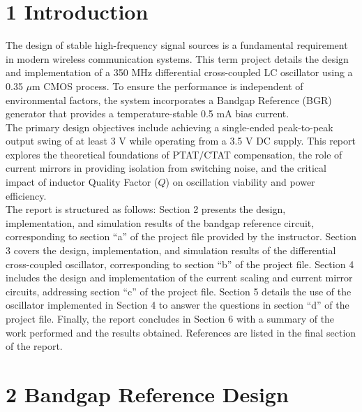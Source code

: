 \documentclass[12pt]{article}
\begin{document}
\section*{1 Introduction}
The design of stable high-frequency signal sources is a fundamental requirement in modern wireless communication systems. This term project details the design and implementation of a 350 MHz differential cross-coupled LC oscillator using a 0.35 $\mu$m CMOS process. To ensure the performance is independent of environmental factors, the system incorporates a Bandgap Reference (BGR) generator that provides a temperature-stable 0.5 mA bias current.\\
\newline
\noindent
The primary design objectives include achieving a single-ended peak-to-peak output swing of at least 3 V while operating from a 3.5 V DC supply. This report explores the theoretical foundations of PTAT/CTAT compensation, the role of current mirrors in providing isolation from switching noise, and the critical impact of inductor Quality Factor ($Q$) on oscillation viability and power efficiency.\\
\newline    
\noindent
The report is structured as follows: Section 2 presents the design, implementation, and simulation results of the bandgap reference circuit, corresponding to section “a” of the project file provided by the instructor. Section 3 covers the design, implementation, and simulation results of the differential cross-coupled oscillator, corresponding to section “b” of the project file. Section 4 includes the design and implementation of the current scaling and current mirror circuits, addressing section “c” of the project file. Section 5 details the use of the oscillator implemented in Section 4 to answer the questions in section “d” of the project file. Finally, the report concludes in Section 6 with a summary of the work performed and the results obtained. References are listed in the final section of the report.
\newpage 

\section*{2 Bandgap Reference Design}
\end{document}
